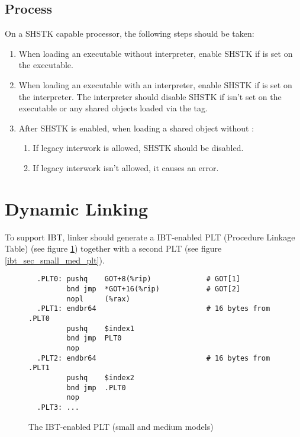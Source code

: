 \subsection{Process }
\label{shstk}

On a SHSTK capable processor, the following steps should be taken:

\begin{enumerate}
  \item
    \begin{sloppypar}
      When loading an executable without interpreter, enable SHSTK if
       is set on the executable.
    \end{sloppypar}
  \item
    \begin{sloppypar}
      When loading an executable with an interpreter, enable SHSTK if
       is set on the interpreter.
      The interpreter should disable SHSTK if
       isn't set on the executable
      or any shared objects loaded via the  tag.
    \end{sloppypar}
  \item
    \begin{sloppypar}
      After SHSTK is enabled, when loading a shared object without
      :
    \end{sloppypar}
    \begin{enumerate}
      \item If legacy interwork is allowed, SHSTK should be disabled.
      \item If legacy interwork isn't allowed, it causes an error.
    \end{enumerate}
\end{enumerate}

\section{Dynamic Linking}

To support IBT, linker should generate a IBT-enabled PLT (Procedure
Linkage Table) (see figure \ref{ibt_small_med_plt}) together with a second
PLT (see figure \ref{ibt_sec_small_med_plt}).

\begin{figure}[H]
\Hrule
\caption{The IBT-enabled PLT (small and medium models)}
\label{ibt_small_med_plt}
\begin{footnotesize}
\begin{verbatim}
  .PLT0: pushq    GOT+8(%rip)             # GOT[1]
         bnd jmp  *GOT+16(%rip)           # GOT[2]
         nopl     (%rax)
  .PLT1: endbr64                          # 16 bytes from .PLT0
         pushq    $index1
         bnd jmp  PLT0
         nop
  .PLT2: endbr64                          # 16 bytes from .PLT1
         pushq    $index2
         bnd jmp  .PLT0
         nop
  .PLT3: ...
\end{verbatim}%
\end{footnotesize}
\Hrule
\end{figure}

